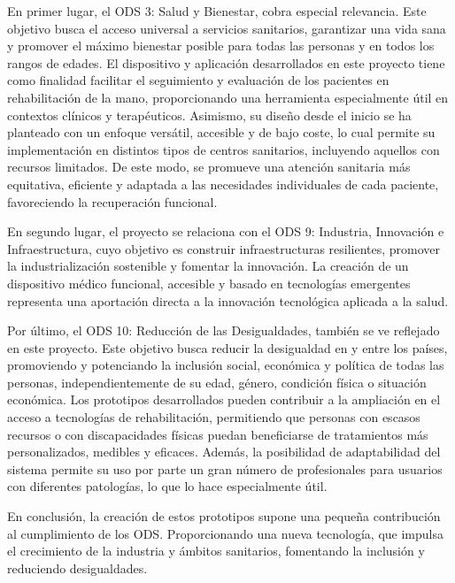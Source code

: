 En primer lugar, el ODS 3: Salud y Bienestar, cobra especial relevancia. Este objetivo busca el acceso universal a servicios sanitarios, garantizar una vida sana y promover el máximo bienestar posible para todas las personas y en todos los rangos de edades. El dispositivo y aplicación desarrollados en este proyecto tiene como finalidad facilitar el seguimiento y evaluación de los pacientes en rehabilitación de la mano, proporcionando una herramienta especialmente útil en contextos clínicos y terapéuticos. Asimismo, su diseño desde el inicio se ha planteado con un enfoque versátil, accesible y de bajo coste, lo cual permite su implementación en distintos tipos de centros sanitarios, incluyendo aquellos con recursos limitados. De este modo, se promueve una atención sanitaria más equitativa, eficiente y adaptada a las necesidades individuales de cada paciente, favoreciendo la recuperación funcional. \cite{salud_ODS}

En segundo lugar, el proyecto se relaciona con el ODS 9: Industria, Innovación e Infraestructura, cuyo objetivo es construir infraestructuras resilientes, promover la industrialización sostenible y fomentar la innovación. La creación de un dispositivo médico funcional, accesible y basado en tecnologías emergentes representa una aportación directa a la innovación tecnológica aplicada a la salud. \cite{infraestructura_ODS}

Por último, el ODS 10: Reducción de las Desigualdades, también se ve reflejado en este proyecto. Este objetivo busca reducir la desigualdad en y entre los países, promoviendo y potenciando la inclusión social, económica y política de todas las personas, independientemente de su edad, género, condición física o situación económica. Los prototipos desarrollados pueden contribuir a la ampliación en el acceso a tecnologías de rehabilitación, permitiendo que personas con escasos recursos o con discapacidades físicas puedan beneficiarse de tratamientos más personalizados, medibles y eficaces. Además, la posibilidad de adaptabilidad del sistema permite su uso por parte un gran número de profesionales para usuarios con diferentes patologías, lo que lo hace especialmente útil.\cite{desigualdades_ODS}

En conclusión, la creación de estos prototipos supone una pequeña contribución al cumplimiento de los ODS. Proporcionando una nueva tecnología, que impulsa el crecimiento de la industria y ámbitos sanitarios, fomentando la inclusión y reduciendo desigualdades.